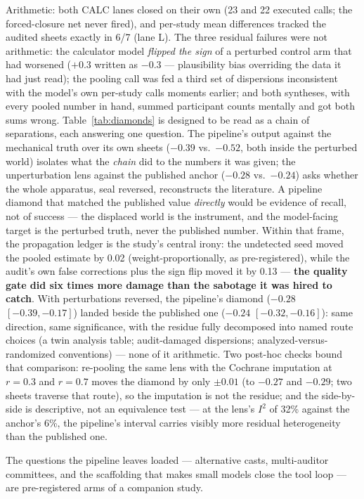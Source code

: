 \documentclass[11pt]{article}
\begin{document}
Arithmetic: both CALC lanes closed on their own (23 and 22 executed calls; the forced-closure net never fired), and per-study mean differences tracked the audited sheets exactly in 6/7 (lane L). The three residual failures were not arithmetic: the calculator model \emph{flipped the sign} of a perturbed control arm that had worsened ($+0.3$ written as $-0.3$ --- plausibility bias overriding the data it had just read); the pooling call was fed a third set of dispersions inconsistent with the model's own per-study calls moments earlier; and both syntheses, with every pooled number in hand, summed participant counts mentally and got both sums wrong. Table~\ref{tab:diamonds} is designed to be read as a chain of separations, each answering one question. The pipeline's output against the mechanical truth over its own sheets ($-0.39$ vs.\ $-0.52$, both inside the perturbed world) isolates what the \emph{chain} did to the numbers it was given; the unperturbation lens against the published anchor ($-0.28$ vs.\ $-0.24$) asks whether the whole apparatus, seal reversed, reconstructs the literature. A pipeline diamond that matched the published value \emph{directly} would be evidence of recall, not of success --- the displaced world is the instrument, and the model-facing target is the perturbed truth, never the published number. Within that frame, the propagation ledger is the study's central irony: the undetected seed moved the pooled estimate by 0.02 (weight-proportionally, as pre-registered), while the audit's own false corrections plus the sign flip moved it by 0.13 --- \textbf{the quality gate did six times more damage than the sabotage it was hired to catch}. With perturbations reversed, the pipeline's diamond ($-0.28$ $[-0.39,-0.17]$) landed beside the published one ($-0.24$ $[-0.32,-0.16]$): same direction, same significance, with the residue fully decomposed into named route choices (a twin analysis table; audit-damaged dispersions; analyzed-versus-randomized conventions) --- none of it arithmetic. Two post-hoc checks bound that comparison: re-pooling the same lens with the Cochrane imputation at $r{=}0.3$ and $r{=}0.7$ moves the diamond by only $\pm 0.01$ (to $-0.27$ and $-0.29$; two sheets traverse that route), so the imputation is not the residue; and the side-by-side is descriptive, not an equivalence test --- at the lens's $I^2$ of 32\% against the anchor's 6\%, the pipeline's interval carries visibly more residual heterogeneity than the published one.

The questions the pipeline leaves loaded --- alternative casts, multi-auditor committees, and the scaffolding that makes small models close the tool loop --- are pre-registered arms of a companion study.
\end{document}
